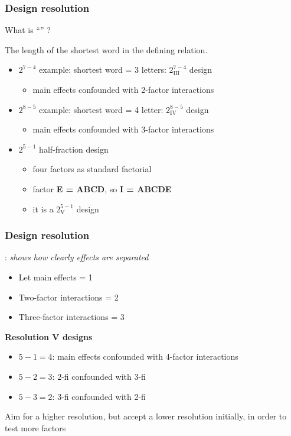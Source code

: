 \begin{frame}\frametitle{Design resolution}
	\begin{block}{What is ``{\color{purple}{Resolution}}'' ?}
		\begin{center}
			The length of the shortest word in the defining relation.
		\end{center}
	\end{block}
	\begin{itemize}
		\item	$2^{7-4}$ example: shortest word = 3 letters: $2^{7-4}_\text{III}$ design
		\begin{itemize}
			\item	main effects confounded with 2-factor interactions
		\end{itemize}
		\item	$2^{8-5}$ example: shortest word = 4 letter: $2^{8-5}_\text{IV}$ design
		\begin{itemize}
			\item	main effects confounded with 3-factor interactions
		\end{itemize}
		\item	$2^{5-1}$ half-fraction design
		\begin{itemize}
			\item	four factors as standard factorial
			\item	factor \textbf{E = ABCD}, so \textbf{I = ABCDE}
			\item	it is a $2^{5-1}_{\text{V}}$ design
		\end{itemize}
	\end{itemize}
\end{frame}

\begin{frame}\frametitle{Design resolution}

	{\color{purple}{Resolution}}: \emph{shows how clearly effects are separated}
	\begin{itemize}
		\item	Let main effects = 1
		\item	Two-factor interactions = 2
		\item	Three-factor interactions = 3
	\end{itemize}

	\textbf{Resolution V designs}
	\begin{itemize}
		\item	$5 - 1 = 4$: main effects confounded with 4-factor interactions
		\item	$5 - 2 = 3$: 2-fi confounded with 3-fi
		\item	$5 - 3 = 2$: 3-fi confounded with 2-fi
	\end{itemize}

	\vspace{12pt}
	\begin{exampleblock}{}
		Aim for a higher resolution, but accept a lower resolution initially, in order to test more factors
	\end{exampleblock}
\end{frame}

